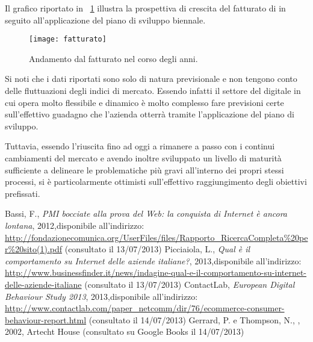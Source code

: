 Il grafico riportato in \figurename~\ref{fig:fatturato} illustra la prospettiva di crescita del fatturato di \customer in seguito all'applicazione del piano di sviluppo biennale.

\begin{figure}[H]
  \centering
  \texttt{[image: fatturato]}
  \caption{Andamento dal fatturato nel corso degli anni.}
  \label{fig:fatturato}
\end{figure}

Si noti che i dati riportati sono solo di natura previsionale e non tengono conto delle fluttuazioni degli indici di mercato. Essendo infatti il settore del \mktg digitale in cui opera \customer molto flessibile e dinamico è molto complesso fare previsioni certe sull'effettivo guadagno che l'azienda otterrà tramite l'applicazione del piano di sviluppo.

Tuttavia, essendo l'\customer riuscita fino ad oggi a rimanere a passo con i continui cambiamenti del mercato e avendo inoltre sviluppato un livello di maturità sufficiente a delineare le problematiche più gravi all'interno dei propri stessi processi, si è particolarmente ottimisti sull'effettivo raggiungimento degli obiettivi prefissati.

\begin{thebibliography}{9}
   Bassi, F., \textit{PMI bocciate alla prova del Web: la conquista di Internet è ancora lontana}, 2012,\newline disponibile all'indirizzo: \url{http://fondazionecomunica.org/UserFiles/files/Rapporto_RicercaCompleta%20per%20sito(1).pdf} (consultato il 13/07/2013)
   Picciaiola, L., \textit{Qual è il comportamento su Internet delle aziende italiane?}, 2013,\newline disponibile all'indirizzo: \url{http://www.businessfinder.it/news/indagine-qual-e-il-comportamento-su-internet-delle-aziende-italiane} (consultato il 13/07/2013)
   ContactLab, \textit{European Digital Behaviour Study 2013}, 2013,\newline disponibile all'indirizzo: \url{http://www.contactlab.com/paper_netcomm/dir/76/ecommerce-consumer-behaviour-report.html} (consultato il 14/07/2013)
   Gerrard, P. e Thompson, N., , 2002, Artecht House (consultato su Google Books il 14/07/2013)
\end{thebibliography}


